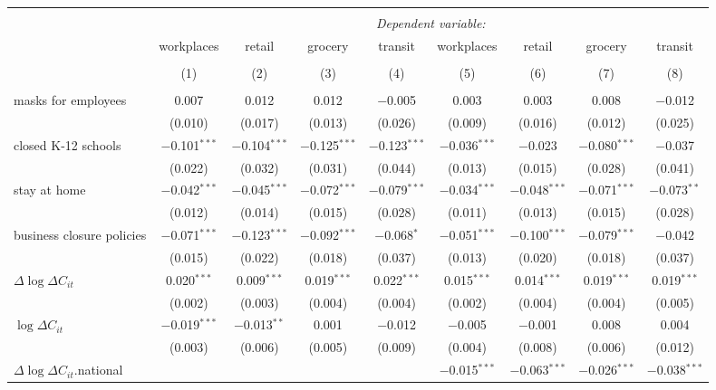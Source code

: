 \begin{tabular}{@{\extracolsep{1pt}}lcccccccc} 
\\[-1.8ex]\hline 
\hline \\[-1.8ex] 
 & \multicolumn{8}{c}{\textit{Dependent variable:}} \\ 
\cline{2-9} 
 & workplaces & retail & grocery & transit & workplaces & retail & grocery & transit \\ 
\\[-1.8ex] & (1) & (2) & (3) & (4) & (5) & (6) & (7) & (8)\\ 
\hline \\[-1.8ex] 
 masks for employees & 0.007 & 0.012 & 0.012 & $-$0.005 & 0.003 & 0.003 & 0.008 & $-$0.012 \\ 
  & (0.010) & (0.017) & (0.013) & (0.026) & (0.009) & (0.016) & (0.012) & (0.025) \\ 
  closed K-12 schools & $-$0.101$^{***}$ & $-$0.104$^{***}$ & $-$0.125$^{***}$ & $-$0.123$^{***}$ & $-$0.036$^{***}$ & $-$0.023 & $-$0.080$^{***}$ & $-$0.037 \\ 
  & (0.022) & (0.032) & (0.031) & (0.044) & (0.013) & (0.015) & (0.028) & (0.041) \\ 
  stay at home & $-$0.042$^{***}$ & $-$0.045$^{***}$ & $-$0.072$^{***}$ & $-$0.079$^{***}$ & $-$0.034$^{***}$ & $-$0.048$^{***}$ & $-$0.071$^{***}$ & $-$0.073$^{**}$ \\ 
  & (0.012) & (0.014) & (0.015) & (0.028) & (0.011) & (0.013) & (0.015) & (0.028) \\ 
  business closure policies & $-$0.071$^{***}$ & $-$0.123$^{***}$ & $-$0.092$^{***}$ & $-$0.068$^{*}$ & $-$0.051$^{***}$ & $-$0.100$^{***}$ & $-$0.079$^{***}$ & $-$0.042 \\ 
  & (0.015) & (0.022) & (0.018) & (0.037) & (0.013) & (0.020) & (0.018) & (0.037) \\ 
  $\Delta \log \Delta C_{it}$ & 0.020$^{***}$ & 0.009$^{***}$ & 0.019$^{***}$ & 0.022$^{***}$ & 0.015$^{***}$ & 0.014$^{***}$ & 0.019$^{***}$ & 0.019$^{***}$ \\ 
  & (0.002) & (0.003) & (0.004) & (0.004) & (0.002) & (0.004) & (0.004) & (0.005) \\ 
  $\log \Delta C_{it}$ & $-$0.019$^{***}$ & $-$0.013$^{**}$ & 0.001 & $-$0.012 & $-$0.005 & $-$0.001 & 0.008 & 0.004 \\ 
  & (0.003) & (0.006) & (0.005) & (0.009) & (0.004) & (0.008) & (0.006) & (0.012) \\ 
  $\Delta \log \Delta C_{it}$.national &  &  &  &  & $-$0.015$^{***}$ & $-$0.063$^{***}$ & $-$0.026$^{***}$ & $-$0.038$^{***}$ \\ 

\end{tabular}
